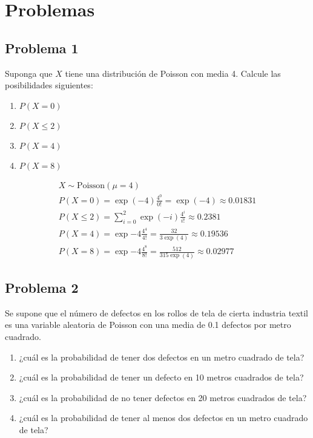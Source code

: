 \documentclass{article}
\begin{document}
    \section{Problemas}

        \subsection{Problema 1}

            Suponga que $X$ tiene una distribución de Poisson con media 4. Calcule las posibilidades siguientes:
            \begin{enumerate}
                \item $P(X = 0)$
                \item $P(X \leq 2)$
                \item $P(X = 4)$
                \item $P(X = 8)$
            \end{enumerate}

            \begin{gather*}
                X \sim \text{Poisson}(\mu = 4) \\
                P(X = 0) = \exp(-4) \frac{4^{0}}{0!} = \exp(-4) \approx 0.01831 \\
                P(X \leq 2) = \sum_{i=0}^{2} \exp(-i) \frac{4^{i}}{i!} \approx 0.2381 \\
                P(X = 4) = \exp{-4} \frac{4^{4}}{4!} = \frac{32}{3 \exp(4)} \approx 0.19536 \\
                P(X = 8) = \exp{-4} \frac{4^{8}}{8!} = \frac{512}{315 \exp(4)} \approx 0.02977
            \end{gather*}

        \subsection*{Problema 2}
            
            Se supone que el número de defectos en los rollos de tela de cierta industria textil es una variable aleatoria de Poisson con una media de 0.1 defectos por metro cuadrado.

            \begin{enumerate}
                \item ¿cuál es la probabilidad de tener dos defectos en un metro cuadrado de tela?
                \item ¿cuál es la probabilidad de tener un defecto en 10 metros cuadrados de tela?
                \item ¿cuál es la probabilidad de no tener defectos en 20 metros cuadrados de tela?
                \item ¿cuál es la probabilidad de tener al menos dos defectos en un metro cuadrado de tela?
            \end{enumerate}
\end{document}
